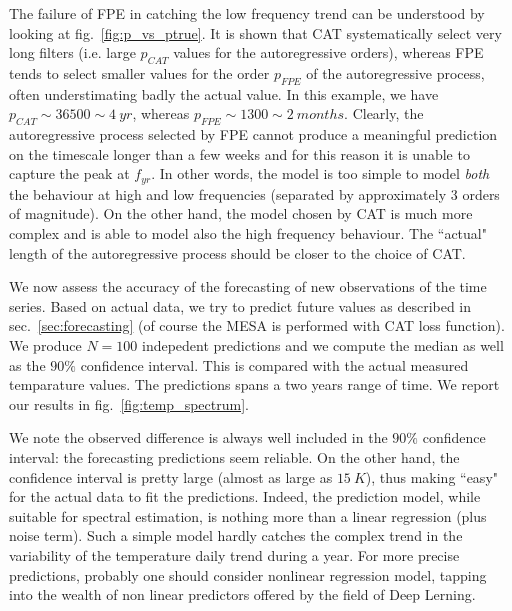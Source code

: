 \documentclass[twocolumn,showpacs,preprintnumbers,nofootinbib,prd,
superscriptaddress,10pt]{revtex4-1}
\begin{document}
The failure of FPE in catching the low frequency trend can be understood by looking at fig.~\ref{fig:p_vs_ptrue}. It is shown that CAT systematically select very long filters (i.e. large $p_{CAT}$ values for the autoregressive orders), whereas FPE tends to select smaller values for the order $p_{FPE}$ of the autoregressive process, often understimating badly the actual value.
In this example, we have $p_{CAT} \sim  36500 \sim  \SI{4}{yr}$, whereas $p_{FPE} \sim  1300 \sim  \SI{2}{months}$.
Clearly, the autoregressive process selected by FPE cannot produce a meaningful prediction on the timescale longer than a few weeks and for this reason it is unable to capture the peak at $f_{yr}$. In other words, the model is too simple to model \textit{both} the behaviour at high and low frequencies (separated by approximately 3 orders of magnitude).
On the other hand, the model chosen by CAT is much more complex and is able to model also the high frequency behaviour.
The ``actual" length of the autoregressive process should be closer to the choice of CAT.

We now assess the accuracy of the forecasting of new observations of the time series.
Based on actual data, we try to predict future values as described in sec.~\ref{sec:forecasting} (of course the MESA is performed with CAT loss function). We produce $N =100$ indepedent predictions and we compute the median as well as the $90\%$ confidence interval. This is compared with the actual measured temparature values.
The predictions spans a two years range of time.
We report our results in fig.~\ref{fig:temp_spectrum}.

We note the observed difference is always well included in the $90\%$ confidence interval: the forecasting predictions seem reliable.
On the other hand, the confidence interval is pretty large (almost as large as $\SI{15}{K}$), thus making ``easy" for the actual data to fit the predictions.
Indeed, the prediction model, while suitable for spectral estimation, is nothing more than a linear regression (plus noise term). Such a simple model hardly catches the complex trend in the variability of the temperature daily trend during a year. For more precise predictions, probably one should consider nonlinear regression model, tapping into the wealth of non linear predictors offered by the field of Deep Lerning.
\end{document}
